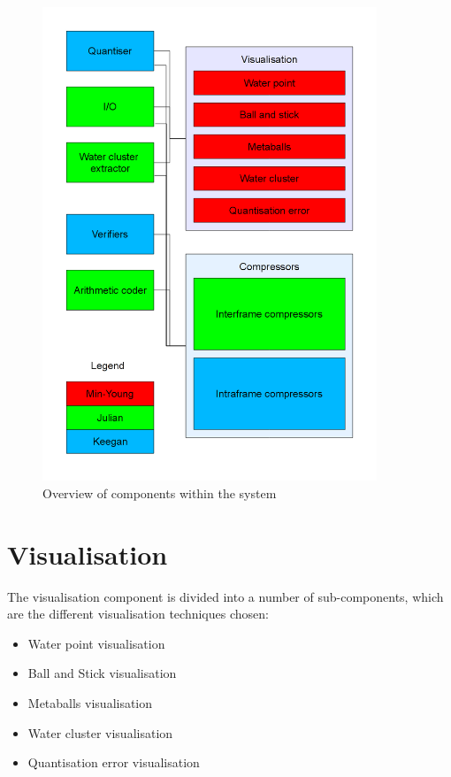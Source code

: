 \begin{figure}[h!]
  \begin{center}
    \includegraphics[width=100mm]{breakdown}
  \end{center}
  \caption{Overview of components within the system}
  \label{fig:design_overview}
\end{figure}


\section{Visualisation}
\label{sec:design_visualisation}


The visualisation component is divided into a number of sub-components, which
are the different visualisation techniques chosen:

\begin{itemize}
  \item Water point visualisation
  \item Ball and Stick visualisation
  \item Metaballs visualisation
  \item Water cluster visualisation
  \item Quantisation error visualisation
\end{itemize}

